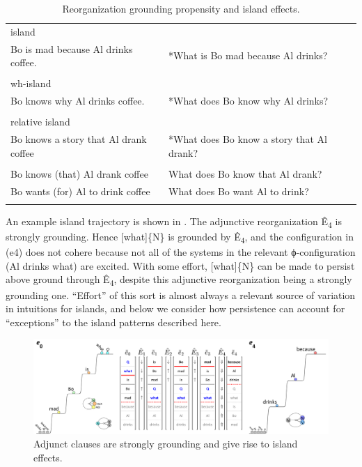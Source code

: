 \begin{table}
\small
\begin{tabularx}{\textwidth}{llQ}
\lsptoprule
{}\\
\midrule
{} island \\
{Bo is mad because Al drinks coffee.} & {*What is Bo mad because Al drinks?}\\
\\
wh-island\\
{Bo knows why Al drinks coffee.} & {*What does Bo know why Al drinks?}\\
\\
relative island\\
{Bo knows a story that Al drank coffee} & {*What does Bo know a story that Al drank?}\\
\tablevspace
{}\\
\midrule 
{Bo knows (that) Al drank coffee} & {What does Bo know that Al drank?}\\
{Bo wants (for) Al to drink coffee} & {What does Bo want Al to drink?}\\
\lspbottomrule
\end{tabularx}
\caption{Reorganization grounding propensity and island effects.}\label{tab:7:5}
\end{table}

  An example island trajectory is shown in {}. The adjunctive reorganization Ê\textsubscript{4} is strongly grounding. Hence [what]\{N\} is grounded by Ê\textsubscript{4}, and the configuration in (e4) does not cohere because not all of the systems in the relevant ϕ-configuration ({\textbar}Al drinks what{\textbar}) are excited. With some effort, [what]\{N\} can be made to persist above ground through Ê\textsubscript{4}, despite this adjunctive reorganization being a strongly grounding one. “Effort” of this sort is almost always a relevant source of variation in  intuitions for islands, and below we consider how persistence can account for “exceptions” to the island patterns described here.

  
\begin{figure}
\includegraphics[width=\textwidth]{figures/Tilsen-img163.png}
\caption{Adjunct clauses are strongly grounding and give rise to island effects.}
\label{fig:7:19}
\end{figure}
 

